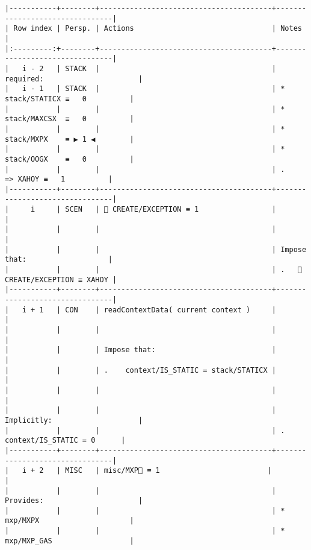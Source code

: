 \documentclass[varwidth=\maxdimen,margin=0.5cm,multi={verbatim}]{standalone}
\begin{document}
\begin{verbatim}
|-----------+--------+----------------------------------------+--------------------------------|
| Row index | Persp. | Actions                                | Notes                          |
|:---------:+--------+----------------------------------------+--------------------------------|
|   i - 2   | STACK  |                                        | required:                      |
|   i - 1   | STACK  |                                        | * stack/STATICX ≡   0          |
|           |        |                                        | * stack/MAXCSX  ≡   0          |
|           |        |                                        | * stack/MXPX    ≡ ▶ 1 ◀        |
|           |        |                                        | * stack/OOGX    ≡   0          |
|           |        |                                        | .      => XAHOY ≡   1          |
|-----------+--------+----------------------------------------+--------------------------------|
|     i     | SCEN   |  CREATE/EXCEPTION ≡ 1                 |                                |
|           |        |                                        |                                |
|           |        |                                        | Impose that:                   |
|           |        |                                        | .    CREATE/EXCEPTION ≡ XAHOY |
|-----------+--------+----------------------------------------+--------------------------------|
|   i + 1   | CON    | readContextData( current context )     |                                |
|           |        |                                        |                                |
|           |        | Impose that:                           |                                |
|           |        | .    context/IS_STATIC = stack/STATICX |                                |
|           |        |                                        |                                |
|           |        |                                        | Implicitly:                    |
|           |        |                                        | .   context/IS_STATIC = 0      |
|-----------+--------+----------------------------------------+--------------------------------|
|   i + 2   | MISC   | misc/MXP🚩 ≡ 1                         |                                |
|           |        |                                        | Provides:                      |
|           |        |                                        | * mxp/MXPX                     |
|           |        |                                        | * mxp/MXP_GAS                  |

\end{verbatim}
\end{document}
